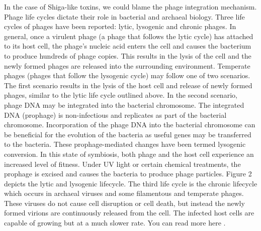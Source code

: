 \documentclass{article}
\begin{document}
In the case of Shiga-like toxins, we could blame the phage integration mechanism. Phage life cycles dictate their role in bacterial and archaeal biology. Three life cycles of phages have been reported: lytic, lysogenic and chronic phages. In general, once a virulent phage (a phage that follows the lytic cycle) has attached to its host cell, the phage’s nucleic acid enters the cell and causes the bacterium to produce hundreds of phage copies. This results in the lysis of the cell and the newly formed phages are released into the surrounding environment. Temperate phages (phages that follow the lysogenic cycle) may follow one of two scenarios. The first scenario results in the lysis of the host cell and release of newly formed phages, similar to the lytic life cycle outlined above. In the second scenario, phage DNA may be integrated into the bacterial chromosome. The integrated DNA (prophage) is non-infectious and replicates as part of the bacterial chromosome. Incorporation of the phage DNA into the bacterial chromosome can be beneficial for the evolution of the bacteria as useful genes may be transferred to the bacteria. These prophage-mediated changes have been termed lysogenic conversion. In this state of symbiosis, both phage and the host cell experience an increased level of fitness. Under UV light or certain chemical treatments, the prophage is excised and causes the bacteria to produce phage particles. Figure 2 depicts the lytic and lysogenic lifecycle. The third life cycle is the chronic lifecycle which occurs in archaeal viruses and some filamentous and temperate phages. These viruses do not cause cell disruption or cell death, but instead the newly formed virions are continuously released from the cell. The infected host cells are capable of growing but at a much slower rate. You can read more here \cite{ncb}.
\end{document}
